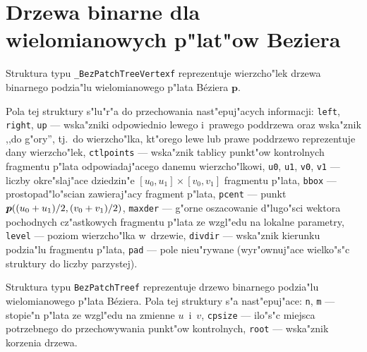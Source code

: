 \section{Drzewa binarne dla wielomianowych p"lat"ow Beziera}

\hspace*{\parindent} Struktura typu \texttt{\_BezPatchTreeVertexf} reprezentuje
wierzcho"lek drzewa binarnego podzia"lu wielomianowego p"lata B\'{e}ziera $\bm{p}$.

\begin{sloppypar}
Pola tej struktury s"lu"r"a do przechowania nast"epuj"acych informacji:
\texttt{left}, \texttt{right}, \texttt{up} --- wska"zniki odpowiednio lewego
i~prawego poddrzewa oraz wska"znik ,,do g"ory'', tj.\ do wierzcho"lka,
kt"orego lewe lub prawe poddrzewo reprezentuje dany wierzcho"lek,
\texttt{ctlpoints} --- wska"znik tablicy punkt"ow kontrolnych 
fragmentu p"lata odpowiadaj"acego danemu wierzcho"lkowi,
\texttt{u0}, \texttt{u1}, \texttt{v0}, \texttt{v1}
--- liczby okre"slaj"ace dziedzin"e $[u_0,u_1]\times[v_0,v_1]$ fragmentu
p"lata, \texttt{bbox} --- prostopad"lo"scian zawieraj"acy fragment p"lata,
\texttt{pcent} --- punkt
$\bm{p}((u_0\nolinebreak +\nolinebreak u_1)/2,
(v_0\nolinebreak +\nolinebreak v_1)/2)$, \texttt{maxder}
--- g"orne oszacowanie d"lugo"sci wektora pochodnych cz"astkowych
fragmentu p"lata ze wzgl"edu na lokalne parametry, \texttt{level} --- poziom
wierzcho"lka w~drzewie, \texttt{divdir} --- wska"znik kierunku podzia"lu
fragmentu p"lata, \texttt{pad} --- pole nieu"rywane (wyr"ownuj"ace
wielko"s"c struktury do liczby parzystej).
\end{sloppypar}

\vspace{\bigskipamount}
Struktura typu \texttt{BezPatchTreef} reprezentuje drzewo binarnego
podzia"lu wielomianowego p"lata B\'{e}ziera. Pola tej struktury s"a nast"epuj"ace:
\texttt{n}, \texttt{m} --- stopie"n p"lata ze wzgl"edu na zmienne $u$~i~$v$,
\texttt{cpsize} --- ilo"s"c miejsca potrzebnego do przechowywania punkt"ow
kontrolnych, \texttt{root} --- wska"znik korzenia drzewa.


